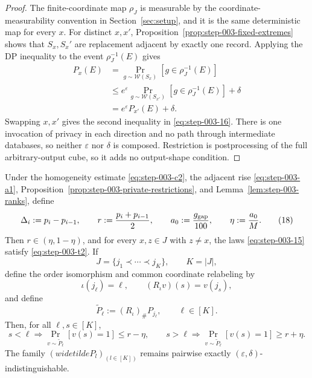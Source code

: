 \begin{proof}

The finite-coordinate map \(\rho_J\) is measurable by the coordinate-measurability convention in Section~\ref{sec:setup}, and it is the same deterministic map for every \(x\). For distinct \(x,x'\), Proposition~\ref{prop:step-003-fixed-extremes} shows that \(S_x,S_x'\) are replacement adjacent by exactly one record. Applying the DP inequality to the event \(\rho_J^{-1}(E)\) gives
\[
\begin{aligned}
P_x(E)
&=\Pr_{g\sim\mathcal W(S_x)}[g\in\rho_J^{-1}(E)]\\
&\le e^\varepsilon
\Pr_{g\sim\mathcal W(S_{x'})}[g\in\rho_J^{-1}(E)]
+\delta\\
&=e^\varepsilon P_{x'}(E)+\delta.
\end{aligned}
\tag{17}\label{eq:step-003-17}
\]
Swapping \(x,x'\) gives the second inequality in \eqref{eq:step-003-16}. There is one invocation of privacy in each direction and no path through intermediate databases, so neither \(\varepsilon\) nor \(\delta\) is composed. Restriction is postprocessing of the full arbitrary-output cube, so it adds no output-shape condition.

\end{proof}


\begin{proposition}
\label{prop:step-003-margin}

Under the homogeneity estimate \eqref{eq:step-003-c2}, the adjacent rise \eqref{eq:step-003-a1}, Proposition~\ref{prop:step-003-private-restrictions}, and Lemma~\ref{lem:step-003-ranks}, define
\[
\Delta_i:=p_i-p_{i-1},
\qquad
r:=\frac{p_i+p_{i-1}}2,
\qquad
a_0:=\frac{g_{\rm gap}}{100},
\qquad
\eta:=\frac{a_0}{M}.
\tag{18}\label{eq:step-003-18}
\]
Then \(r \in (\eta,1-\eta)\), and for every \(x,z \in J\) with \(z \ne  x\), the laws \eqref{eq:step-003-15} satisfy \eqref{eq:step-003-t2}. If
\[
J=\{j_1\prec\cdots\prec j_K\},
\qquad K=|J|,
\tag{19}\label{eq:step-003-19}
\]
define the order isomorphism and common coordinate relabeling by
\[
\iota(j_\ell)=\ell,
\qquad
(R_\iota v)(s)=v(j_s),
\tag{19a}\label{eq:step-003-19a}
\]
and define
\[
\widetilde P_\ell:=(R_\iota)_\# P_{j_\ell},
\qquad \ell\in[K].
\tag{19b}\label{eq:step-003-19b}
\]
Then, for all \(\ell,s \in [K]\),
\[
s<\ell
\Longrightarrow
\Pr_{v\sim\widetilde P_\ell}[v(s)=1]\le r-\eta,
\qquad
s>\ell
\Longrightarrow
\Pr_{v\sim\widetilde P_\ell}[v(s)=1]\ge r+\eta.
\tag{20}\label{eq:step-003-20}
\]
The family \((widetilde P_l)_(l \in [K])\) remains pairwise exactly \((\varepsilon,\delta)\)-indistinguishable.

\end{proposition}

